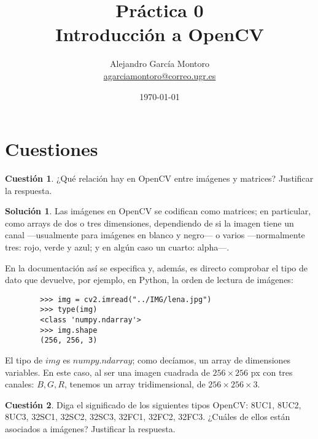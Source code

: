 \documentclass[a4paper, 11pt]{article}
\title{Práctica 0 \\ Introducción a OpenCV}
\author{Alejandro García Montoro\\
    \href{mailto:agarciamontoro@correo.ugr.es}{agarciamontoro@correo.ugr.es}}
\date{\today}
\theoremstyle{definition}
\newtheorem{cuestion}{Cuestión}
\newtheorem*{solucion}{Solución}
\begin{document}
  \maketitle

  \section{Cuestiones}

  \begin{cuestion}
      ¿Qué relación hay en OpenCV entre imágenes y matrices? Justificar la respuesta.
  \end{cuestion}

  \begin{solucion}
    Las imágenes en OpenCV se codifican como matrices; en particular, como arrays de dos o tres dimensiones, dependiendo de si la imagen tiene un canal ---usualmente para imágenes en blanco y negro--- o varios ---normalmente tres: rojo, verde y azul; y en algún caso un cuarto: alpha---.

    En la documentación así se especifica y, además, es directo comprobar el tipo de dato que devuelve, por ejemplo, en Python, la orden de lectura de imágenes:

    \begin{lstlisting}
        >>> img = cv2.imread("../IMG/lena.jpg")
        >>> type(img)
        <class 'numpy.ndarray'>
        >>> img.shape
        (256, 256, 3)
    \end{lstlisting}

    El tipo de $img$ es $numpy.ndarray$; como decíamos, un array de dimensiones variables. En este caso, al ser una imagen cuadrada de $256\times256$ px con tres canales: $B,G,R$, tenemos un array tridimensional, de $256\times256\times3$.
  \end{solucion}

  \begin{cuestion}
      Diga el significado de los siguientes tipos OpenCV: 8UC1, 8UC2, 8UC3, 32SC1, 32SC2, 32SC3, 32FC1, 32FC2, 32FC3. ¿Cuáles de ellos están asociados a imágenes? Justificar la respuesta.
  \end{cuestion}
\end{document}
